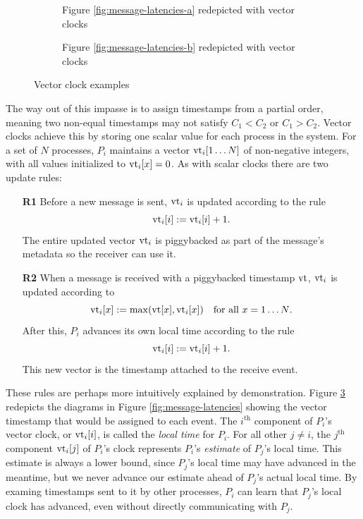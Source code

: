 \documentclass[]             %
{NASA}                       %
\theoremstyle{definition}
\begin{document}
\begin{figure}
  \setlength\belowcaptionskip{5ex}

  \begin{subfigure}{1\textwidth}
    \centering
    
    \caption{Figure \ref{fig:message-latencies-a} redepicted with vector clocks}
    \label{fig:message-latencies-vector-a}
  \end{subfigure}

  \vspace{4ex}

  \begin{subfigure}{1\textwidth}
    \centering 
    \caption{Figure \ref{fig:message-latencies-b} redepicted with vector clocks}
    \label{fig:message-latencies-vector-b}
  \end{subfigure}

  \caption{Vector clock examples}
  \label{fig:message-latencies-vector}
\end{figure}
\afterpage{\clearpage}

The way out of this impasse is to assign timestamps from a partial
order, meaning two non-equal timestamps may not satisfy $C_1 < C_2$ or
$C_1 > C_2$. Vector clocks achieve this by storing one scalar value
for each process in the system. For a set of $N$ processes, $P_i$
maintains a vector $\textrm{vt}_i[1 \ldots N]$ of non-negative integers, with
all values initialized to $\textrm{vt}_i[x] = 0$. As with scalar clocks there
are two update rules:
\begin{enumerate}
\item[\textbf{R1}] Before a new message is sent, $\textrm{vt}_i$ is updated according to the rule
  \[\textrm{vt}_i[i] := \textrm{vt}_i[i] + 1.\]
  The entire updated vector $\textrm{vt}_i$ is piggybacked as part of the
  message's metadata so the receiver can use it.
\item[\textbf{R2}] When a message is received with a piggybacked timestamp $\textrm{vt}$,
  $\textrm{vt}_i$ is updated according to
  \[\textrm{vt}_i[x] := \max(\textrm{vt}[x], \textrm{vt}_i[x]) \quad \textrm{for all $x = 1\ldots N$}.\]
  After this, $P_i$ advances its own local time according to the rule
  \[ \textrm{vt}_i[i] := \textrm{vt}_i[i] + 1.\]
  This new vector is the timestamp attached to the receive event.
\end{enumerate}

These rules are perhaps more intuitively explained by demonstration.
Figure \ref{fig:message-latencies-vector} redepicts the diagrams in
Figure \ref{fig:message-latencies} showing the vector timestamp that
would be assigned to each event. The $i^\textrm{th}$ component of
$P_i$'s vector clock, or $\textrm{vt}_i[i]$, is called the \emph{local time}
for $P_i$. For all other $j \neq i$, the $j^\textrm{th}$ component
$\textrm{vt}_i[j]$ of $P_i$'s clock represents $P_i$'s \emph{estimate} of
$P_j$'s local time. This estimate is always a lower bound, since
$P_j$'s local time may have advanced in the meantime, but we never
advance our estimate ahead of $P_j$'s actual local time. By examing
timestamps sent to it by other processes, $P_i$ can learn that $P_j$'s
local clock has advanced, even without directly communicating with
$P_j$.
\end{document}
